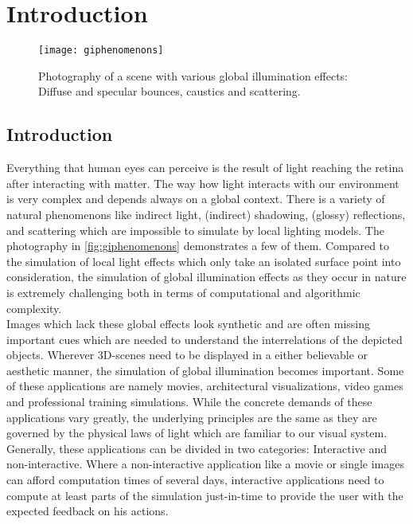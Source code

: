 \documentclass[thesis.tex]{subfiles}
\begin{document}
\chapter{Introduction}
\label{chap:introduction}

\begin{figure}[h]
\centering
\texttt{[image: giphenomenons]}
\caption{\cite{bib:RealtimeGIOverview} Photography of a scene with various global illumination effects: Diffuse and specular bounces, caustics and scattering.}
\label{fig:giphenomenons}
\end{figure}

\section{Introduction}
Everything that human eyes can perceive is the result of light reaching the retina after interacting with matter.
The way how light interacts with our environment is very complex and depends always on a global context.
There is a variety of natural phenomenons like indirect light, (indirect) shadowing, (glossy) reflections, and scattering which are impossible to simulate by local lighting models.
The photography in \autoref{fig:giphenomenons} demonstrates a few of them.
Compared to the simulation of local light effects which only take an isolated surface point into consideration, the simulation of global illumination effects as they occur in nature is extremely challenging both in terms of computational and algorithmic complexity.
\\
Images which lack these global effects look synthetic and are often missing important cues which are needed to understand the interrelations of the depicted objects.
Wherever 3D-scenes need to be displayed in a either believable or aesthetic manner, the simulation of global illumination becomes important.
Some of these applications are namely movies, architectural visualizations, video games and professional training simulations.
While the concrete demands of these applications vary greatly, the underlying principles are the same as they are governed by the physical laws of light which are familiar to our visual system.
\\
Generally, these applications can be divided in two categories: Interactive and non-interactive.
Where a non-interactive application like a movie or single images can afford computation times of several days, interactive applications need to compute at least parts of the simulation just-in-time to provide the user with the expected feedback on his actions.
\end{document}

